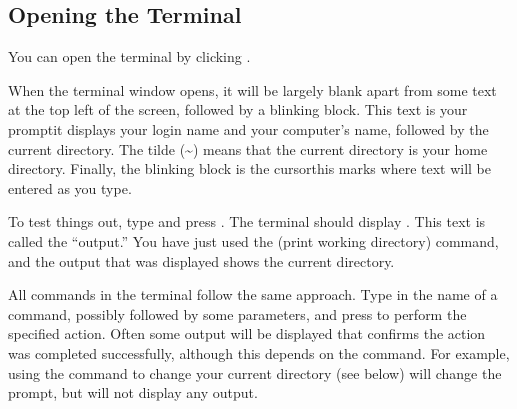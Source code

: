 \subsection{Opening the Terminal}

You can open the terminal by clicking .

When the terminal window opens, it will be largely blank apart from some text at the top left of the screen, 
followed by a blinking block. This text is your \gls{prompt}\dash it displays
your login name and your computer's name, followed by the current directory. 
The tilde (\textasciitilde)
means that the current directory is your home directory. Finally, the 
blinking block is the \gls{cursor}\dash this marks where text will be entered as you type.

To test things out, type  and press . The 
terminal should display .
This text is called the ``\gls{output}.'' You have just used the
 (print working directory) command, and the output that was displayed shows the current directory.


All commands in the terminal follow the same approach. Type in the name of a 
command, possibly followed by some \glspl{parameter}, and
press  to perform the specified action. 
Often some output will be displayed
that confirms the action was completed successfully, although this depends on the command. For example, using the  command
to change your current directory (see below) will change the prompt, but will not display any output.

